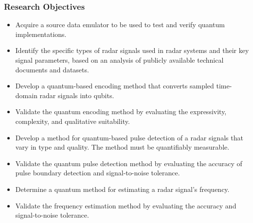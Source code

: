 \subsubsection{Research Objectives}
\begin{itemize}
    \item Acquire a source data emulator to be used to test and verify quantum implementations.
    \item Identify the specific types of radar signals used in radar systems and their key signal parameters, based on an analysis of publicly available technical documents and datasets.
    \item Develop a quantum-based encoding method that converts sampled time-domain radar signals into qubits.
    \item Validate the quantum encoding method by evaluating the expressivity, complexity, and qualitative suitability.
    \item Develop a method for quantum-based pulse detection of a radar signals that vary in type and quality. The method must be quantifiably measurable.
    \item Validate the quantum pulse detection method by evaluating the accuracy of pulse boundary detection and signal-to-noise tolerance.
    \item Determine a quantum method for estimating a radar signal's frequency.
    \item Validate the frequency estimation method by evaluating the accuracy and signal-to-noise tolerance.
\end{itemize}



